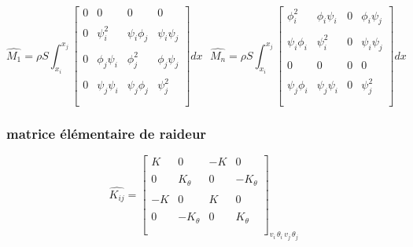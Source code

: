 \documentclass[a4paper,10pt]{report} %
\begin{document}
 
 \[ \widehat{M_1}=\rho S\int_{x_i}^{x_j}\left[ \begin{array}{cccc}
0 &0&0&0    \\\\
0 & \psi_i^2& \psi_i\phi_j&\psi_i\psi_j \\\\
0&\phi_j\psi_i& \phi_j^2&\phi_j\psi_j     \\\\
0 &\psi_j\psi_i&\psi_j \phi_j&\psi_j^2    \\\\
 \end{array} \right]dx
 \,\,\,\,
 \widehat{M_n}=\rho S\int_{x_i}^{x_j}\left[ \begin{array}{cccc}
\phi_i^2 &\phi_i\psi_i&0&\phi_i\psi_j     \\\\
\psi_i\phi_i & \psi_i^2&0&\psi_i\psi_j \\\\
0 &0& 0&0   \\\\
\psi_j\phi_i &\psi_j\psi_i&0&\psi_j^2 \\\\
 \end{array} \right]dx\]
 
 \subsubsection{matrice élémentaire de raideur}
\[ \widehat{K_{ij}}=\left[ \begin{array}{cccc}
K &0& -K&0     \\\\
0 & K_{\theta}&0&-K_{\theta} \\\\
-K &0& K&0     \\\\
0&-K_{\theta}& 0&K_{\theta}   \\\\
 \end{array} \right]_{v_i \, \theta_i \, v_j \, \theta_j \, } \]
 
\end{document}
